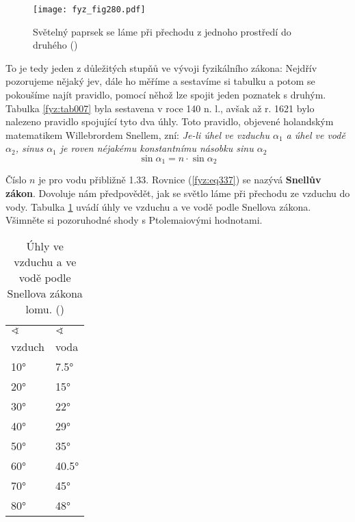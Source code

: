 {    \begin{figure}[ht!] %
      \centering
      \texttt{[image: fyz\_fig280.pdf]}
      \caption{Světelný paprsek se láme při přechodu z jednoho prostředí do druhého
               (\cite[s.~346]{Feynman01})}
      \label{fyz:fig280}
    \end{figure}
    
    To je tedy jeden z důležitých stupňů ve vývoji fyzikálního zákona: Nejdřív pozorujeme nějaký 
    jev, dále ho měříme a sestavíme si tabulku a potom se pokoušíme najít pravidlo, pomocí něhož
    lze spojit jeden poznatek s druhým. Tabulka \ref{fyz:tab007} byla sestavena v roce 140 n. l., 
    avšak až r. 1621 bylo nalezeno pravidlo spojující tyto dva úhly. Toto pravidlo, objevené 
    holandským matematikem Willebrordem Snellem, zní: \emph{Je-li úhel ve vzduchu \(\alpha_1\) a 
    úhel ve vodě \(\alpha_2\), sinus \(\alpha_1\) je roven néjakému konstantnímu násobku sinu 
    \(\alpha_2\)}
    \begin{equation}\label{fyz:eq337}
      \sin\alpha_1 = n\cdot\sin\alpha_2
    \end{equation}
    
    Číslo \(n\) je pro vodu přibližně \num{1.33}. Rovnice (\ref{fyz:eq337}) se nazývá 
    \textbf{Snellův zákon}. Dovoluje nám předpovědět, jak se světlo láme při přechodu ze vzduchu do 
    vody. Tabulka \ref{fyz:tab008} uvádí úhly ve vzduchu a ve vodě podle Snellova zákona. Všimněte 
    si pozoruhodné shody s Ptolemaiovými hodnotami.

    \begin{table}[ht!]     %
      \centering
      \renewcommand{\arraystretch}{1.4}
      \begin{tabular}{>{\centering\arraybackslash}p{3em}|>{\centering\arraybackslash}p{3em}}
         \hline \(\sphericalangle\) & \(\sphericalangle\)     \\
                    vzduch & voda         \\
         \hline   \ang{10} & \ang{7.5}    \\
                  \ang{20} & \ang{15}     \\
                  \ang{30} & \ang{22}     \\
                  \ang{40} & \ang{29}     \\
                  \ang{50} & \ang{35}     \\
                  \ang{60} & \ang{40.5}   \\
                  \ang{70} & \ang{45}     \\
                  \ang{80} & \ang{48}     \\
         \hline 
      \end{tabular}
      \caption{Úhly ve vzduchu a ve vodě podle Snellova zákona lomu.
               (\cite[s.~347]{Feynman01})}
      \label{fyz:tab008}
    \end{table}
    
}
